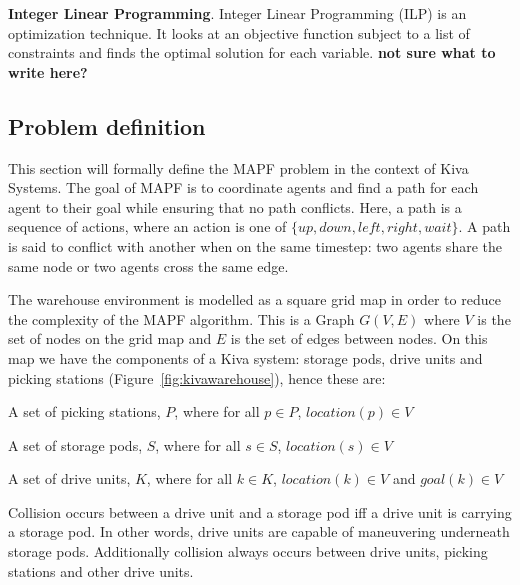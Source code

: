 \documentclass[a4paper,11pt]{article}
\begin{document}
\noindent \textbf{Integer Linear Programming}. Integer Linear Programming (ILP) is an optimization technique. It looks at an objective function subject to a list of constraints and finds the optimal solution for each variable. \textbf{not sure what to write here?}

%

\subsection{Problem definition} \label{sec:problemdef}
This section will formally define the MAPF problem in the context of Kiva Systems. The goal of MAPF is to coordinate agents and find a path for each agent to their goal while ensuring that no path conflicts. Here, a path is a sequence of actions, where an action is one of $\{up, down, left, right, wait\}$. A path is said to conflict with another when on the same timestep: two agents share the same node or two agents cross the same edge.

The warehouse environment is modelled as a square grid map in order to reduce the complexity of the MAPF algorithm. This is a  Graph $G(V, E)$ where $V$ is the set of nodes on the grid map and $E$ is the set of edges between nodes. On this map we have the components of a Kiva system: storage pods, drive units and picking stations (Figure~\ref{fig:kivawarehouse}), hence these are:
\begin{compactitem}
	\item A set of picking stations, $P$, where for all $p \in P$, $location (p) \in V$
	\item A set of storage pods, $S$, where for all $s \in S$, $location (s) \in V$
	\item A set of drive units, $K$, where for all $k \in K$, $location(k) \in V$ and $goal(k) \in V$
\end{compactitem}

\noindent Collision occurs between a drive unit and a storage pod iff a drive unit is carrying a storage pod. In other words, drive units are capable of maneuvering underneath storage pods. Additionally collision always occurs between drive units, picking stations and other drive units.
\end{document}
